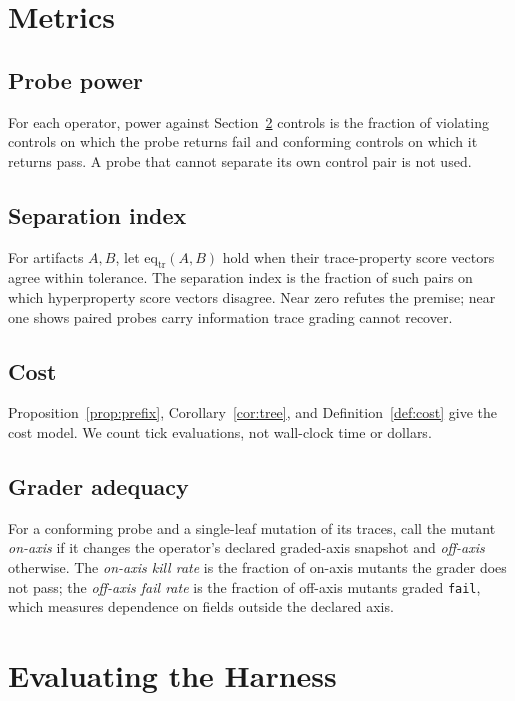 \documentclass[sigconf,review,anonymous]{acmart}
\begin{document}
	\section{Metrics}
	\label{sec:metrics}
	
	\subsection{Probe power}
	
	For each operator, power against Section~\ref{sec:protocol} controls is the
	fraction of violating controls on which the probe returns fail and conforming
	controls on which it returns pass. A probe that cannot separate its own
	control pair is not used.
	
	\subsection{Separation index}
	
	For artifacts $A,B$, let $\mathrm{eq}_{\mathrm{tr}}(A,B)$ hold when their
	trace-property score vectors agree within tolerance. The separation index is
	the fraction of such pairs on which hyperproperty score vectors disagree.
	Near zero refutes the premise; near one shows paired probes carry information
	trace grading cannot recover.
	
	\subsection{Cost}
	
	Proposition~\ref{prop:prefix}, Corollary~\ref{cor:tree}, and
	Definition~\ref{def:cost} give the cost model. We count tick evaluations,
	not wall-clock time or dollars.

	\subsection{Grader adequacy}
	\label{sec:adequacy-metric}

	For a conforming probe and a single-leaf mutation of its traces, call the
	mutant \emph{on-axis} if it changes the operator's declared graded-axis
	snapshot and \emph{off-axis} otherwise. The \emph{on-axis kill rate} is the
	fraction of on-axis mutants the grader does not pass; the \emph{off-axis
	fail rate} is the fraction of off-axis mutants graded \texttt{fail}, which
	measures dependence on fields outside the declared axis.
	
	\section{Evaluating the Harness}
	\label{sec:protocol}
	
\end{document}
